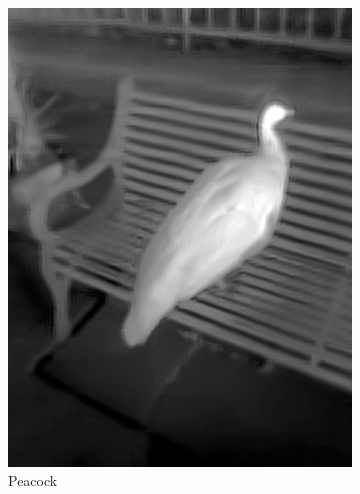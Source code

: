 \documentclass{l4proj}
\begin{document}
\begin{figure}[ht]
\begin{subfigure}[h!]{0.18\textwidth}
    \includegraphics[width=\textwidth, trim={0cm 2.5cm 0cm 2.5cm}, clip]{images/dataset/peacock/lwir.png}
    \caption{Peacock}
  \end{subfigure}
  \begin{subfigure}[h!]{0.18\textwidth}

\end{subfigure}
\end{figure}
\end{document}
